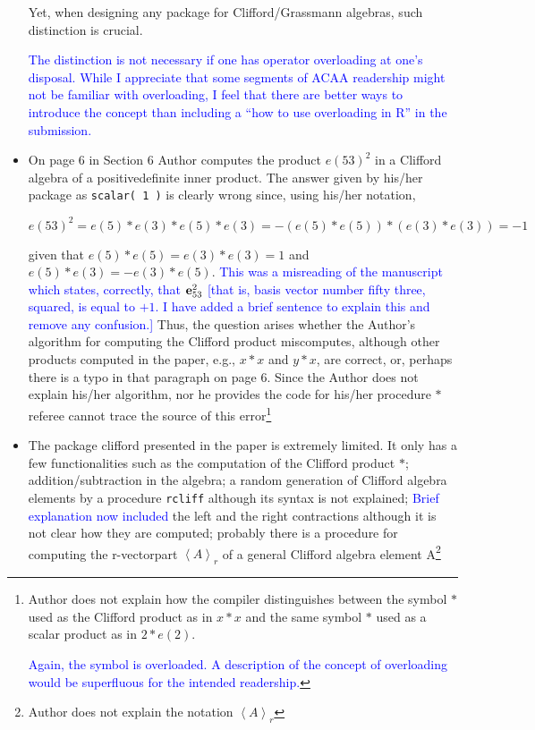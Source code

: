 \documentclass{article}
\newcommand{\ei}[1]{\ensuremath{{\bf e}_{#1}}}
\begin{document}
\begin{itemize}
  Yet, when designing any package for Clifford/Grassmann algebras,
  such distinction is crucial.

  \textcolor{blue}{The distinction is not necessary if one has
    operator overloading at one's disposal.  While I appreciate that
    some segments of ACAA readership might not be familiar with
    overloading, I feel that there are better ways to introduce the
    concept than including a ``how to use overloading in R'' in the
    submission.}

\item On page 6 in Section 6 Author computes the product $e(53)^2$ in
  a Clifford algebra of a positivedefinite inner product. The answer
  given by his/her package as \verb+scalar( 1 )+ is clearly wrong
  since, using his/her notation,

  $$
  e(53)^2=e(5)*e(3)*e(5)*e(3)=-(e(5)*e(5))*(e(3)*e(3))=-1
  $$

  given that $e(5)*e(5)=e(3)*e(3)=1$ and $e(5)*e(3)=-e(3)*e(5)$.
  \textcolor{blue}{This was a misreading of the manuscript which
    states, correctly, that $\ei{53}^2$ [that is, basis vector number
      fifty three, squared, is equal to $+1$.  I have added a brief
      sentence to explain this and remove any confusion.]}
   Thus,
the question arises whether the Author’s algorithm for computing the
Clifford product miscomputes, although other products computed in the
paper, e.g., $x * x$ and $y * x$, are correct, or, perhaps there is a
typo in that paragraph on page 6.  Since the Author does not explain
his/her algorithm, nor he provides the code for his/her procedure $*$
referee cannot trace the source of this error\footnote{Author does not
explain how the compiler distinguishes between the symbol $*$ used as
the Clifford product as in $x * x$ and the same symbol $*$ used as a
scalar product as in $2 * e(2)$.

\textcolor{blue}{Again, the {\tt *} symbol is overloaded.  A
  description of the concept of overloading would be superfluous for
  the intended readership.}  }

\item The package clifford presented in the paper is extremely
  limited. It only has a few functionalities such as the computation
  of the Clifford product $*$; addition/subtraction in the algebra; a
  random generation of Clifford algebra elements by a procedure
  \verb+rcliff+ although its syntax is not explained;
  \textcolor{blue}{Brief explanation now included} the left and the
  right contractions although it is not clear how they are computed;
  probably there is a procedure for computing the r-vectorpart
  $\left\langle A\right\rangle_r$ of a general Clifford algebra
  element A\footnote{ Author does not explain the notation
  $\left\langle A\right\rangle_r$

}
\end{itemize}
\end{document}
